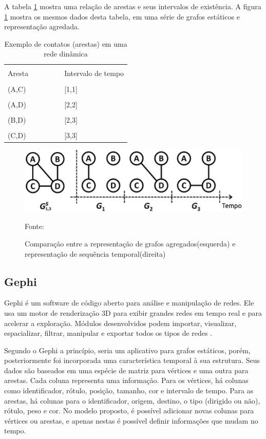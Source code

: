 A tabela \ref{tab:kim} mostra uma relação de arestas e seus intervalos de existência. A figura \ref{fig:grafoKim} mostra os mesmos
dados desta tabela, em uma série de grafos estáticos e representação agredada.

\begin{table}[htbp]
	\centering
	\begin{tabular}{l l l l l l}
	\toprule
	\\Aresta & & & & & Intervalo de tempo\\
	\midrule
	\\(A,C) & & & & & [1,1]\\
	\\(A,D) & & & & & [2,2]\\
	\\(B,D) & & & & & [2,3]\\
	\\(C,D) & & & & & [3,3]\\
	\bottomrule
	\end{tabular}
\caption{Exemplo de contatos (arestas) em uma rede dinâmica}
 \label{tab:kim}
\end{table}

\begin{figure}[htbp]
\centering
 \includegraphics[width=.55\textwidth]{figuras/kim.png}
\caption{Comparação entre a representação de grafos agregados(esquerda) e representação de sequência temporal(direita)}
Fonte: \cite{kim}
\label{fig:grafoKim}
\end{figure}
\FloatBarrier

\subsection{Gephi}
Gephi é um software de código aberto para análise e manipulação de redes.
Ele usa um motor de renderização 3D para exibir grandes redes em tempo real e para acelerar a exploração.
Módulos desenvolvidos podem importar, visualizar, espacializar, filtrar, manipular e exportar todos os tipos de redes \cite{gephi}.

Segundo \cite{dynagraph} o Gephi a princípio, seria um aplicativo para grafos estáticos, porém, posteriormente
foi incorporada uma característica temporal à sua estrutura. Seus dados são baseados em
uma espécie de matriz para vértices e uma outra para arestas. Cada coluna representa uma
informação. Para os vértices, há colunas como identificador, rótulo, posição, tamanho, cor
e intervalo de tempo. Para as arestas, há colunas para o identificador, origem, destino, o
tipo (dirigido ou não), rótulo, peso e cor. No modelo proposto, é possível adicionar novas
colunas para vértices ou arestas, e apenas nestas é possível definir informações que mudam
no tempo.

